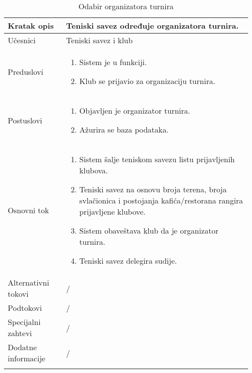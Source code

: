 \documentclass{article}
\begin{document}
    \begin{longtable}{| p{} | p{} |} 
        \hline
            Kratak opis & Teniski savez određuje organizatora turnira.\\ 
        \hline    
            U\v{c}esnici & Teniski savez i klub\\
        \hline
            Preduslovi & 
                \begin{enumerate}
                    \item Sistem je u funkciji.
                    \item Klub se prijavio za organizaciju turnira.
                \end{enumerate}\\
        \hline  
            Postuslovi & 
                \begin{enumerate}
                    \item Objavljen je organizator turnira.
                    \item Ažurira se baza podataka.
                \end{enumerate}\\
        \hline
            Osnovni tok & 
                \begin{enumerate}
                    \item Sistem šalje teniskom savezu listu prijavljenih klubova.
                    \item Teniski savez na osnovu broja terena, broja svlačionica i postojanja kafića/restorana rangira prijavljene klubove.
                    \item Sistem obaveštava klub da je organizator turnira.
                    \item Teniski savez delegira sudije.
                \end{enumerate}\\
        \hline
            Alternativni tokovi & /\\
        \hline
            Podtokovi & /\\
        \hline
            Specijalni zahtevi & /\\
        \hline
            Dodatne informacije & /\\
        \hline    
        \caption{Odabir organizatora turnira}
    \end{longtable}
\end{document}
